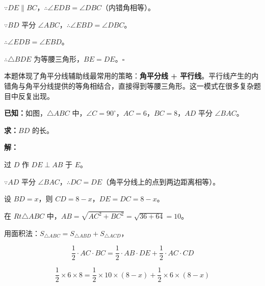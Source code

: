 \documentclass[12pt, a4paper]{ctexart}
\begin{document}
\(\because DE \parallel BC\)，\(\therefore \angle EDB = \angle DBC\)（内错角相等）。

\(\because BD\) 平分 \(\angle ABC\)，\(\therefore \angle EBD = \angle DBC\)。

\(\therefore \angle EDB = \angle EBD\)。

\(\therefore \triangle BDE\) 为等腰三角形，\(BE = DE\)。\hfill\(\square\)

\begin{tipbox}[思路点拨]
本题体现了角平分线辅助线最常用的策略：\textbf{角平分线 + 平行线}。平行线产生的内错角与角平分线提供的等角相结合，直接得到等腰三角形。这一模式在很多复杂题目中反复出现。
\end{tipbox}

\begin{examplebox}
\textbf{已知：}如图，\(\triangle ABC\) 中，\(\angle C = 90^\circ\)，\(AC = 6\)，\(BC = 8\)，\(AD\) 平分 \(\angle BAC\)。

\textbf{求：}\(BD\) 的长。
\end{examplebox}

\noindent\textbf{解：}

\begin{center}
\end{center}

过 \(D\) 作 \(DE \perp AB\) 于 \(E\)。

\(\because AD\) 平分 \(\angle BAC\)，\(\therefore DC = DE\)（角平分线上的点到两边距离相等）。

设 \(BD = x\)，则 \(CD = 8 - x\)，\(DE = DC = 8 - x\)。

在 \(Rt\triangle ABC\) 中，\(AB = \sqrt{AC^2 + BC^2} = \sqrt{36 + 64} = 10\)。

用面积法：\(S_{\triangle ABC} = S_{\triangle ABD} + S_{\triangle ACD}\)，

\[\frac{1}{2} \cdot AC \cdot BC = \frac{1}{2} \cdot AB \cdot DE + \frac{1}{2} \cdot AC \cdot CD\]

\[\frac{1}{2} \times 6 \times 8 = \frac{1}{2} \times 10 \times (8-x) + \frac{1}{2} \times 6 \times (8-x)\]
\end{document}
